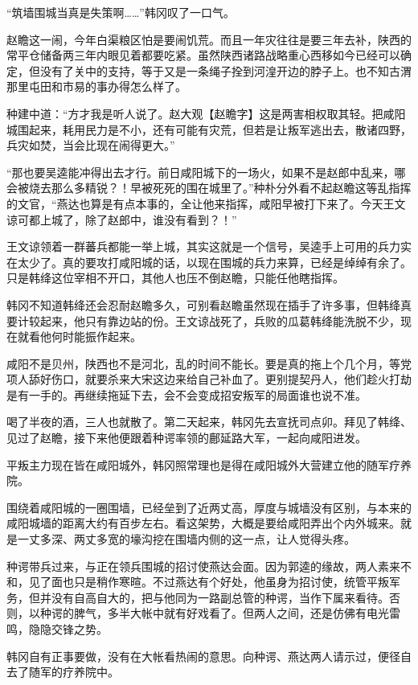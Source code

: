 “筑墙围城当真是失策啊……”韩冈叹了一口气。

赵瞻这一闹，今年白渠粮区怕是要闹饥荒。而且一年灾往往是要三年去补，陕西的常平仓储备两三年内眼见着都要吃紧。虽然陕西诸路战略重心西移如今已经可以确定，但没有了关中的支持，等于又是一条绳子拴到河湟开边的脖子上。也不知古渭那里屯田和市易的事办得怎么样了。

种建中道：“方才我是听人说了。赵大观【赵瞻字】这是两害相权取其轻。把咸阳城围起来，耗用民力是不小，还有可能有灾荒，但若是让叛军逃出去，散诸四野，兵灾如焚，当会比现在闹得更大。”

“那也要吴逵能冲得出去才行。前日咸阳城下的一场火，如果不是赵郎中乱来，哪会被烧去那么多精锐？！早被死死的围在城里了。”种朴分外看不起赵瞻这等乱指挥的文官，“燕达也算是有点本事的，全让他来指挥，咸阳早被打下来了。今天王文谅可都上城了，除了赵郎中，谁没有看到？！”

王文谅领着一群蕃兵都能一举上城，其实这就是一个信号，吴逵手上可用的兵力实在太少了。真的要攻打咸阳城的话，以现在围城的兵力来算，已经是绰绰有余了。只是韩绛这位宰相不开口，其他人也压不倒赵瞻，只能任他瞎指挥。

韩冈不知道韩绛还会忍耐赵瞻多久，可别看赵瞻虽然现在插手了许多事，但韩绛真要计较起来，他只有靠边站的份。王文谅战死了，兵败的瓜葛韩绛能洗脱不少，现在就看他何时能振作起来。

咸阳不是贝州，陕西也不是河北，乱的时间不能长。要是真的拖上个几个月，等党项人舔好伤口，就要杀来大宋这边来给自己补血了。更别提契丹人，他们趁火打劫是有一手的。再继续拖延下去，会不会变成招安叛军的局面谁也说不准。

喝了半夜的酒，三人也就散了。第二天起来，韩冈先去宣抚司点卯。拜见了韩绛、见过了赵瞻，接下来他便跟着种谔率领的鄜延路大军，一起向咸阳进发。

平叛主力现在皆在咸阳城外，韩冈照常理也是得在咸阳城外大营建立他的随军疗养院。

围绕着咸阳城的一圈围墙，已经垒到了近两丈高，厚度与城墙没有区别，与本来的咸阳城墙的距离大约有百步左右。看这架势，大概是要给咸阳弄出个内外城来。就是一丈多深、两丈多宽的壕沟挖在围墙内侧的这一点，让人觉得头疼。

种谔带兵过来，与正在领兵围城的招讨使燕达会面。因为郭逵的缘故，两人素来不和，见了面也只是稍作寒暄。不过燕达有个好处，他虽身为招讨使，统管平叛军务，但并没有自高自大的，把与他同为一路副总管的种谔，当作下属来看待。否则，以种谔的脾气，多半大帐中就有好戏看了。但两人之间，还是仿佛有电光雷鸣，隐隐交锋之势。

韩冈自有正事要做，没有在大帐看热闹的意思。向种谔、燕达两人请示过，便径自去了随军的疗养院中。

